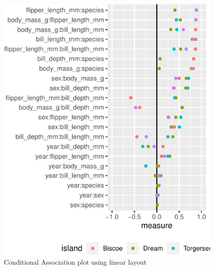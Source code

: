 \begin{Schunk}
\begin{figure}

{\centering \includegraphics{rj_paper_files/figure-latex/linear_cond_assoc-1} 

}

\caption[Conditional Association plot using linear layout]{Conditional Association plot using linear layout}\label{fig:linear_cond_assoc}
\end{figure}
\end{Schunk}



\address{%
Amit Chinwan\\
Maynooth University\\%
Hamilton Institute\\ Maynooth, Ireland\\
%
%
%
\href{mailto:amit.chinwan.2019@mumail.ie}{\nolinkurl{amit.chinwan.2019@mumail.ie}}%
}

\address{%
Catherine Hurley\\
Maynooth University\\%
Department of Mathematics and Statistics\\ Maynooth, Ireland\\
%
%
%
\href{mailto:catherine.hurley@mu.ie}{\nolinkurl{catherine.hurley@mu.ie}}%
}
